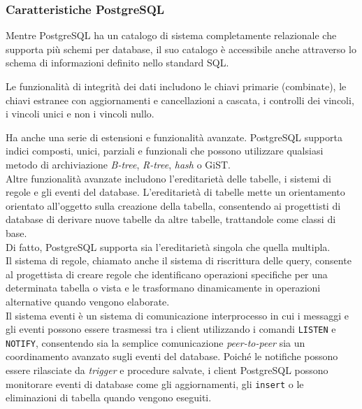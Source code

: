 \subsubsection{Caratteristiche PostgreSQL}
Mentre PostgreSQL ha un catalogo di sistema completamente relazionale che supporta pi\`{u} schemi per database, il suo catalogo \`{e} accessibile anche attraverso lo schema di informazioni definito nello standard SQL.

Le funzionalit\`{a} di integrit\`{a} dei dati includono le chiavi primarie (combinate), le chiavi estranee con aggiornamenti e cancellazioni a cascata, i controlli dei vincoli, i vincoli unici e non i vincoli nullo.

Ha anche una serie di estensioni e funzionalit\`{a} avanzate. PostgreSQL supporta indici composti, unici, parziali e funzionali che possono utilizzare qualsiasi metodo di archiviazione \textit{B-tree}, \textit{R-tree}, \textit{hash} o GiST.\cite{etichetta15}\\

Altre funzionalit\`{a} avanzate includono l'ereditariet\`{a} delle tabelle, i sistemi di regole e gli eventi del database. L'ereditariet\`{a} di tabelle mette un orientamento orientato all'oggetto sulla creazione della tabella, consentendo ai progettisti di database di derivare nuove tabelle da altre tabelle, trattandole come classi di base.\\
Di fatto, PostgreSQL supporta sia l'ereditariet\`{a} singola che quella multipla.\\

Il sistema di regole, chiamato anche il sistema di riscrittura delle query, consente al progettista di creare regole che identificano operazioni specifiche per una determinata tabella o vista e le trasformano dinamicamente in operazioni alternative quando vengono elaborate.\\
Il sistema eventi \`{e} un sistema di comunicazione interprocesso in cui i messaggi e gli eventi possono essere trasmessi tra i client utilizzando i comandi \verb"LISTEN" e \verb"NOTIFY", consentendo sia la semplice comunicazione \textit{peer-to-peer} sia un coordinamento avanzato sugli eventi del database. Poich\'{e} le notifiche possono essere rilasciate da \textit{trigger} e procedure salvate, i client PostgreSQL possono monitorare eventi di database come gli aggiornamenti, gli \verb"insert" o le eliminazioni di tabella quando vengono eseguiti.\cite{etichetta15}

